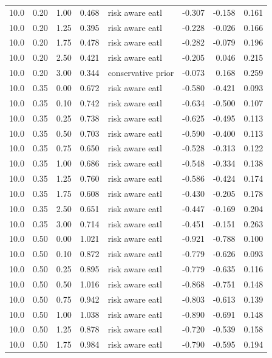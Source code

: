 \begin{longtable}{rrrrlrrr}
10.0 & 0.20 & 1.00 & 0.468 & risk aware eatl & -0.307 & -0.158 & 0.161 \\
10.0 & 0.20 & 1.25 & 0.395 & risk aware eatl & -0.228 & -0.026 & 0.166 \\
10.0 & 0.20 & 1.75 & 0.478 & risk aware eatl & -0.282 & -0.079 & 0.196 \\
10.0 & 0.20 & 2.50 & 0.421 & risk aware eatl & -0.205 & 0.046 & 0.215 \\
10.0 & 0.20 & 3.00 & 0.344 & conservative prior & -0.073 & 0.168 & 0.259 \\
10.0 & 0.35 & 0.00 & 0.672 & risk aware eatl & -0.580 & -0.421 & 0.093 \\
10.0 & 0.35 & 0.10 & 0.742 & risk aware eatl & -0.634 & -0.500 & 0.107 \\
10.0 & 0.35 & 0.25 & 0.738 & risk aware eatl & -0.625 & -0.495 & 0.113 \\
10.0 & 0.35 & 0.50 & 0.703 & risk aware eatl & -0.590 & -0.400 & 0.113 \\
10.0 & 0.35 & 0.75 & 0.650 & risk aware eatl & -0.528 & -0.313 & 0.122 \\
10.0 & 0.35 & 1.00 & 0.686 & risk aware eatl & -0.548 & -0.334 & 0.138 \\
10.0 & 0.35 & 1.25 & 0.760 & risk aware eatl & -0.586 & -0.424 & 0.174 \\
10.0 & 0.35 & 1.75 & 0.608 & risk aware eatl & -0.430 & -0.205 & 0.178 \\
10.0 & 0.35 & 2.50 & 0.651 & risk aware eatl & -0.447 & -0.169 & 0.204 \\
10.0 & 0.35 & 3.00 & 0.714 & risk aware eatl & -0.451 & -0.151 & 0.263 \\
10.0 & 0.50 & 0.00 & 1.021 & risk aware eatl & -0.921 & -0.788 & 0.100 \\
10.0 & 0.50 & 0.10 & 0.872 & risk aware eatl & -0.779 & -0.626 & 0.093 \\
10.0 & 0.50 & 0.25 & 0.895 & risk aware eatl & -0.779 & -0.635 & 0.116 \\
10.0 & 0.50 & 0.50 & 1.016 & risk aware eatl & -0.868 & -0.751 & 0.148 \\
10.0 & 0.50 & 0.75 & 0.942 & risk aware eatl & -0.803 & -0.613 & 0.139 \\
10.0 & 0.50 & 1.00 & 1.038 & risk aware eatl & -0.890 & -0.691 & 0.148 \\
10.0 & 0.50 & 1.25 & 0.878 & risk aware eatl & -0.720 & -0.539 & 0.158 \\
10.0 & 0.50 & 1.75 & 0.984 & risk aware eatl & -0.790 & -0.595 & 0.194 \\

\end{longtable}
